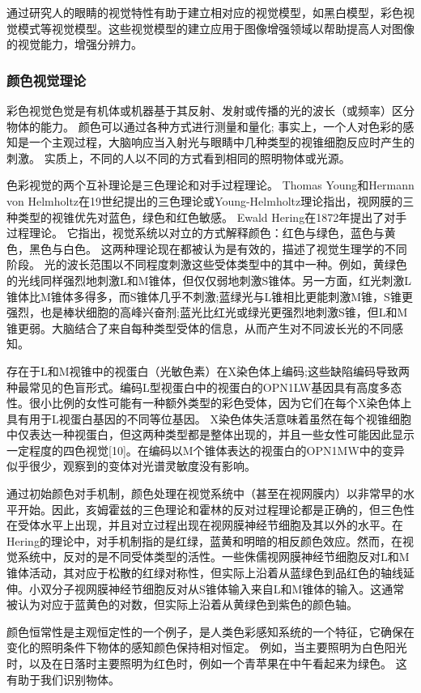 通过研究人的眼睛的视觉特性有助于建立相对应的视觉模型，如黑白模型，彩色视觉模式等视觉模型。这些视觉模型的建立应用于图像增强领域以帮助提高人对图像的视觉能力，增强分辨力。
				\subsubsection{颜色视觉理论}彩色视觉色觉是有机体或机器基于其反射、发射或传播的光的波长（或频率）区分物体的能力。 颜色可以通过各种方式进行测量和量化; 事实上，一个人对色彩的感知是一个主观过程，大脑响应当入射光与眼睛中几种类型的视锥细胞反应时产生的刺激。 实质上，不同的人以不同的方式看到相同的照明物体或光源。

色彩视觉的两个互补理论是三色理论和对手过程理论。 Thomas Young和Hermann von Helmholtz在19世纪提出的三色理论或Young-Helmholtz理论指出，视网膜的三种类型的视锥优先对蓝色，绿色和红色敏感。 Ewald Hering在1872年提出了对手过程理论。 它指出，视觉系统以对立的方式解释颜色：红色与绿色，蓝色与黄色，黑色与白色。 这两种理论现在都被认为是有效的，描述了视觉生理学的不同阶段。
光的波长范围以不同程度刺激这些受体类型中的其中一种。例如，黄绿色的光线同样强烈地刺激L和M锥体，但仅仅弱地刺激S锥体。另一方面，红光刺激L锥体比M锥体多得多，而S锥体几乎不刺激;蓝绿光与L锥相比更能刺激M锥，S锥更强烈，也是棒状细胞的高峰兴奋剂;蓝光比红光或绿光更强烈地刺激S锥，但L和M锥更弱。大脑结合了来自每种类型受体的信息，从而产生对不同波长光的不同感知。

存在于L和M视锥中的视蛋白（光敏色素）在X染色体上编码;这些缺陷编码导致两种最常见的色盲形式。编码L型视蛋白中的视蛋白的OPN1LW基因具有高度多态性。很小比例的女性可能有一种额外类型的彩色受体，因为它们在每个X染色体上具有用于L视蛋白基因的不同等位基因。 X染色体失活意味着虽然在每个视锥细胞中仅表达一种视蛋白，但这两种类型都是整体出现的，并且一些女性可能因此显示一定程度的四色视觉[10]。在编码以M个锥体表达的视蛋白的OPN1MW中的变异似乎很少，观察到的变体对光谱灵敏度没有影响。

通过初始颜色对手机制，颜色处理在视觉系统中（甚至在视网膜内）以非常早的水平开始。因此，亥姆霍兹的三色理论和霍林的反对过程理论都是正确的，但三色性在受体水平上出现，并且对立过程出现在视网膜神经节细胞及其以外的水平。在Hering的理论中，对手机制指的是红绿，蓝黄和明暗的相反颜色效应。然而，在视觉系统中，反对的是不同受体类型的活性。一些侏儒视网膜神经节细胞反对L和M锥体活动，其对应于松散的红绿对称性，但实际上沿着从蓝绿色到品红色的轴线延伸。小双分子视网膜神经节细胞反对从S锥体输入来自L和M锥体的输入。这通常被认为对应于蓝黄色的对数，但实际上沿着从黄绿色到紫色的颜色轴。

颜色恒常性是主观恒定性的一个例子，是人类色彩感知系统的一个特征，它确保在变化的照明条件下物体的感知颜色保持相对恒定。 例如，当主要照明为白色阳光时，以及在日落时主要照明为红色时，例如一个青苹果在中午看起来为绿色。 这有助于我们识别物体。

